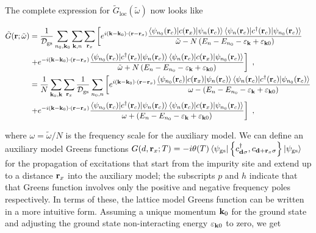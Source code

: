\documentclass[reprint,hidelinks]{revtex4-2}
\begin{document}
The complete expression for \(\tilde G_\text{loc}(\tilde\omega)\) now looks like
\begin{widetext}
\begin{equation}\begin{aligned}
	\tilde G({\bf r}; \tilde\omega) &= \frac{1}{\mathcal{D}_\text{gs}}\sum_{n_0,{\bf k}_0}\sum_{{\bf k}, n}\sum_{{\bf r}_x}  \left[e^{i \left({\bf k}- {\bf k}_0\right)\cdot\left({\bf r} - {\bf r}_x\right)}\frac{\braket{\psi_{n_0}({\bf r}_c)| c({\bf r}_x) |\psi_{n}({\bf r}_c)} \braket{\psi_n({\bf r}_c)|c^\dagger({\bf r}_c)|\psi_{n_0}({\bf r}_c)}}{\tilde\omega - N\left( E_n - E_{n_0} - \varepsilon_{\bf k} + \varepsilon_{{\bf k}0}\right) } \right.\\
					  &\left.+ e^{-i \left({\bf k}- {\bf k}_0\right)\cdot\left({\bf r} - {\bf r}_x\right)}\frac{\braket{\psi_{n_0}({\bf r}_c)| c^\dagger({\bf r}_c) |\psi_{n}({\bf r}_c)} \braket{\psi_n({\bf r}_c)|c({\bf r}_x)|\psi_{n_0}({\bf r}_c)}}{\tilde\omega + N\left( E_n - E_{n_0} - \varepsilon_{\bf k} + \varepsilon_{{\bf k}0}\right) }\right] ~,\\
					  &= \frac{1}{N}\sum_{{\bf k}_0, {\bf k}}\sum_{{\bf r}_x}  \frac{1}{\mathcal{D}_\text{gs}}\sum_{n_0,n}\left[e^{i \left({\bf k}- {\bf k}_0\right)\cdot\left({\bf r} - {\bf r}_x\right)}\frac{\braket{\psi_{n_0}({\bf r}_c)| c({\bf r}_x) |\psi_{n}({\bf r}_c)} \braket{\psi_n({\bf r}_c)|c^\dagger({\bf r}_c)|\psi_{n_0}({\bf r}_c)}}{\omega - \left( E_n - E_{n_0} - \varepsilon_{\bf k} + \varepsilon_{{\bf k}0}\right) } \right.\\
					  &\left.+ e^{-i \left({\bf k}- {\bf k}_0\right)\cdot\left({\bf r} - {\bf r}_x\right)}\frac{\braket{\psi_{n_0}({\bf r}_c)| c^\dagger({\bf r}_c) |\psi_{n}({\bf r}_c)} \braket{\psi_n({\bf r}_c)|c({\bf r}_x)|\psi_{n_0}({\bf r}_c)}}{\omega + \left( E_n - E_{n_0} - \varepsilon_{\bf k} + \varepsilon_{{\bf k}0}\right) }\right] ~,
\end{aligned}\end{equation}
\end{widetext}
where \(\omega = \tilde\omega/N\) is the frequency scale for the auxiliary model. We can define an auxiliary model Greens functions \(G(d,{\bf r}_x; T) = -i\theta(T)\braket{\psi_\text{gs} | \left\{c^\dagger_{{\bf d}\sigma}, c_{{\bf d} + {\bf r}_x\sigma}\right\} | \psi_\text{gs}}\) for the propagation of excitations that start from the impurity site and extend up to a distance \({\bf r}_x\) into the auxiliary model; the subscripts \(p\) and \(h\) indicate that that Greens function involves only the positive and negative frequency poles respectively. In terms of these, the lattice model Greens function can be written in a more intuitive form. Assuming a unique momentum \({\bf k}_0\) for the ground state and adjusting the ground state non-interacting energy \(\varepsilon_{{\bf k}0}\) to zero, we get
\end{document}
